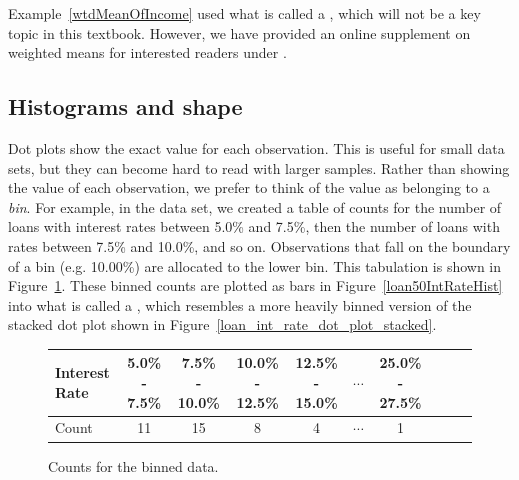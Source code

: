 Example~\ref{wtdMeanOfIncome} used what is called
a ,
which will not be a key topic in this textbook.
However, we have provided an online supplement on
weighted means for interested readers under
.

\subsection{Histograms and shape}
\label{histogramsAndShape}

Dot plots show the exact value for each observation.
This is useful for small data sets, but they can become
hard to read with larger samples. Rather than showing the
value of each observation, we prefer to think of the value
as belonging to a \emph{bin}.
For example, in the  data set, we created
a table of counts for the number of loans with interest
rates between 5.0\% and 7.5\%, then the number of loans
with rates between 7.5\% and 10.0\%, and so on.
Observations that fall on the boundary of a bin
(e.g. 10.00\%) are allocated to the lower bin.
This tabulation is shown in Figure~\ref{binnedIntRateAmountTable}.
These binned counts are plotted as bars in
Figure~\ref{loan50IntRateHist} into what is called
a , which resembles a more heavily binned
version of the stacked dot plot shown in
Figure~\ref{loan_int_rate_dot_plot_stacked}.

\begin{figure}[ht]
\centering\small
\begin{tabular}{l ccc ccc ccc} %
  \hline
Interest Rate & 5.0\% - 7.5\% & 7.5\% - 10.0\% & 10.0\% - 12.5\% & 12.5\% - 15.0\% & $\cdots$ & 25.0\% - 27.5\% \\
  \hline
Count & 11 &  15 &   8 &   4 &   $\cdots$ &   1 \\
  \hline
\end{tabular}
\caption{Counts for the binned
     data.}
\label{binnedIntRateAmountTable}
\end{figure}

